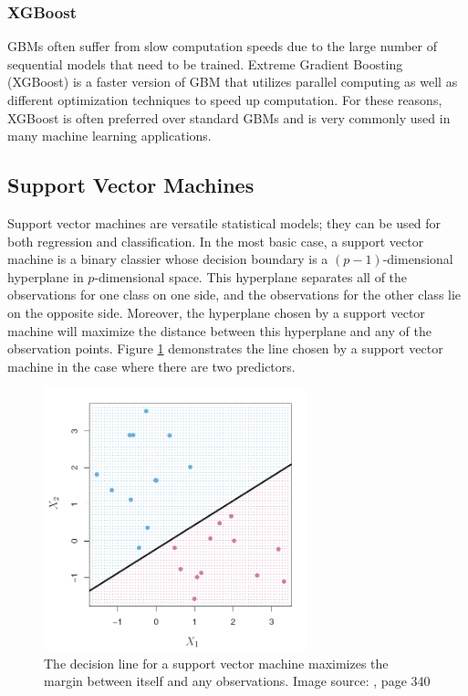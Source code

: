 \documentclass{article}
\begin{document}
\subsubsection{XGBoost}
GBMs often suffer from slow computation speeds due to the large number of sequential models that need to be trained. Extreme Gradient Boosting (XGBoost) is a faster version of GBM that utilizes parallel computing as well as different optimization techniques to speed up computation. For these reasons, XGBoost is often preferred over standard GBMs and is very commonly used in many machine learning applications.

\subsection{Support Vector Machines}
Support vector machines are versatile statistical models; they can be used for both regression and classification. In the most basic case, a support vector machine is a binary classier whose decision boundary is a $(p-1)$-dimensional hyperplane in $p$-dimensional space. This hyperplane separates all of the observations for one class on one side, and the observations for the other class lie on the opposite side. Moreover, the hyperplane chosen by a support vector machine will maximize the distance between this hyperplane and any of the observation points. Figure \ref{fig:svm-1} demonstrates the line chosen by a support vector machine in the case where there are two predictors.

\begin{figure}[!h]
	\centering
	\caption{The decision line for a support vector machine maximizes the margin between itself and any observations. Image source: \cite{james2013introduction}, page 340}
	\label{fig:svm-1}
	\includegraphics[width = 3in]{images/svm-1.png}
\end{figure}
\end{document}
